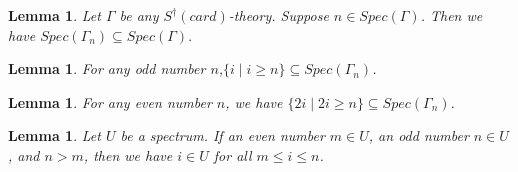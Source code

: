 \documentclass[10pt,a4paper]{amsart}
\newtheorem{lemma}[theorem]{Lemma}
\begin{document}
\begin{lemma}\label{smallest}
Let $\Gamma$ be any $S^\dagger(card)$-theory. Suppose $n\in Spec(\Gamma)$. Then we have $Spec(\Gamma_n)
\subseteq Spec(\Gamma).$
\end{lemma}

\begin{lemma}\label{o_indiscernible}
	For any odd number $n$,$\{i \mid i \geq n\}\subseteq Spec(\Gamma_n)$.  
\end{lemma}

\begin{lemma}\label{e_indiscernible}
	For any even number $n$, we have $\{2i \mid 2i \geq n \} \subseteq Spec(\Gamma_n)$.
\end{lemma}

\begin{lemma}\label{eo_indiscernible}
	Let $U$ be a spectrum. If an even number $m \in U$, an odd number $n \in U$, and $n > m$, then we have $i \in U$ for all $m \leq i \leq n$. 
\end{lemma}
\end{document}
